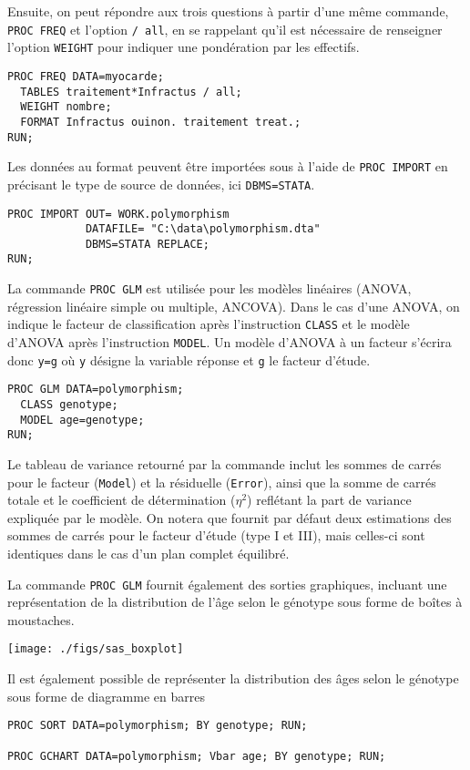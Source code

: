 Ensuite, on peut répondre aux trois questions à partir d'une même commande,
\texttt{PROC FREQ} et l'option \texttt{/ all}, en se rappelant qu'il est
nécessaire de renseigner l'option \texttt{WEIGHT} pour indiquer une
pondération par les effectifs.
\begin{verbatim}
PROC FREQ DATA=myocarde;
  TABLES traitement*Infractus / all;
  WEIGHT nombre;
  FORMAT Infractus ouinon. traitement treat.;
RUN;
\end{verbatim}
%
%
%
\soln{\ref{exo:9.5}}
Les données au format \Stata peuvent être importées sous \SAS à l'aide de
\texttt{PROC IMPORT} en précisant le type de source de données, ici
\texttt{DBMS=STATA}.
\begin{verbatim}
PROC IMPORT OUT= WORK.polymorphism
            DATAFILE= "C:\data\polymorphism.dta"
            DBMS=STATA REPLACE;
RUN;
\end{verbatim}

La commande \texttt{PROC GLM} est utilisée pour les modèles linéaires
(ANOVA, régression linéaire simple ou multiple, ANCOVA). Dans le cas d'une
ANOVA, on indique le facteur de classification après l'instruction
\texttt{CLASS} et le modèle d'ANOVA après l'instruction \texttt{MODEL}. Un
modèle d'ANOVA à un facteur s'écrira donc \texttt{y=g} où \texttt{y} désigne
la variable réponse et \texttt{g} le facteur d'étude. 
\begin{verbatim}
PROC GLM DATA=polymorphism; 
  CLASS genotype; 
  MODEL age=genotype; 
RUN;
\end{verbatim}
Le tableau de variance retourné par la commande inclut les sommes de carrés
pour le facteur (\texttt{Model}) et la résiduelle (\texttt{Error}), ainsi
que la somme de carrés totale et le coefficient de détermination ($\eta^2$)
reflétant la part de variance expliquée par le modèle. On notera que \SAS
fournit par défaut deux estimations des sommes de carrés pour le facteur
d'étude (type I et III), mais celles-ci sont identiques dans le cas d'un
plan complet équilibré.

La commande \texttt{PROC GLM} fournit également des sorties graphiques,
incluant une représentation de la distribution de l'âge selon le génotype
sous forme de boîtes à moustaches.

\texttt{[image: ./figs/sas\_boxplot]}

Il est également possible de représenter la distribution des âges selon le
génotype sous forme de diagramme en barres
\begin{verbatim}
PROC SORT DATA=polymorphism; BY genotype; RUN;

PROC GCHART DATA=polymorphism; Vbar age; BY genotype; RUN;
\end{verbatim}

